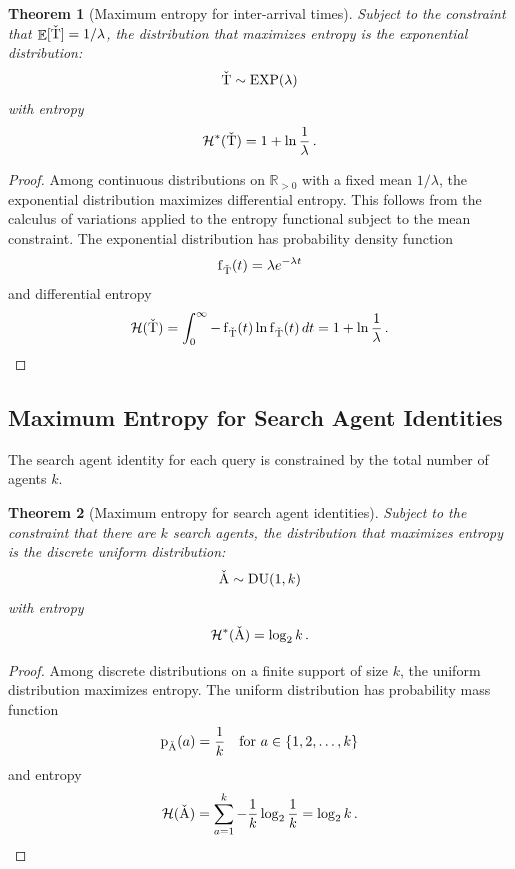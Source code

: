 \documentclass[final,11pt]{article}
\newcommand{\rvhts}[1][]{%
   \ifthenelse{ \equal{#1}{} }
      {\ensuremath{\rv{\check{T}}}}
      {\ensuremath{\rv{\check{T}_{#1}}}}
}
\newcommand{\rvhsa}[1][]{%
   \ifthenelse{ \equal{#1}{} }
      {\ensuremath{\rv{\check{A}}}}
      {\ensuremath{\rv{\check{A}_{#1}}}}
}
\newcommand{\rv}[1]{\mathrm{#1}}
\newcommand{\entropy}{\operatorname{\mathcal{H}}}
\newcommand{\pdf}{\operatorname{f}}
\newcommand{\pmf}{\operatorname{p}}
\newcommand{\expdist}{\operatorname{\rm{EXP}}}
\newcommand{\dudist}{\operatorname{\rm{DU}}}
\DeclareMathOperator{\expectation}{\mathbb{E}}
\numberwithin{equation}{section}
\theoremstyle{plain}
\newtheorem{theorem}{Theorem}[section]
\theoremstyle{remark}
\begin{document}
\begin{theorem}[Maximum entropy for inter-arrival times]
Subject to the constraint that $\expectation[\rvhts] = 1/\lambda$, the distribution that maximizes entropy is the exponential distribution:
\begin{equation}
    \rvhts \sim \expdist(\lambda)
\end{equation}
with entropy
\begin{equation}
    \entropy^*(\rvhts) = 1 + \ln \frac{1}{\lambda}\,.
\end{equation}
\end{theorem}

\begin{proof}
Among continuous distributions on $\mathbb{R}_{>0}$ with a fixed mean $1/\lambda$, the exponential distribution maximizes differential entropy. This follows from the calculus of variations applied to the entropy functional subject to the mean constraint. The exponential distribution has probability density function
\begin{equation}
    \pdf_{\rvhts}(t) = \lambda e^{-\lambda t}
\end{equation}
and differential entropy
\begin{equation}
    \entropy(\rvhts) = \int_0^{\infty} -\pdf_{\rvhts}(t) \ln \pdf_{\rvhts}(t) \, dt = 1 + \ln \frac{1}{\lambda}\,.
\end{equation}
\end{proof}

\subsection{Maximum Entropy for Search Agent Identities}
The search agent identity for each query is constrained by the total number of agents $k$.

\begin{theorem}[Maximum entropy for search agent identities]
Subject to the constraint that there are $k$ search agents, the distribution that maximizes entropy is the discrete uniform distribution:
\begin{equation}
    \rvhsa \sim \dudist(1, k)
\end{equation}
with entropy
\begin{equation}
    \entropy^*(\rvhsa) = \log_2 k\,.
\end{equation}
\end{theorem}

\begin{proof}
Among discrete distributions on a finite support of size $k$, the uniform distribution maximizes entropy. The uniform distribution has probability mass function
\begin{equation}
    \pmf_{\rvhsa}(a) = \frac{1}{k} \quad \text{for } a \in \{1, 2, \ldots, k\}
\end{equation}
and entropy
\begin{equation}
    \entropy(\rvhsa) = \sum_{a=1}^{k} -\frac{1}{k} \log_2 \frac{1}{k} = \log_2 k\,.
\end{equation}
\end{proof}
\end{document}
